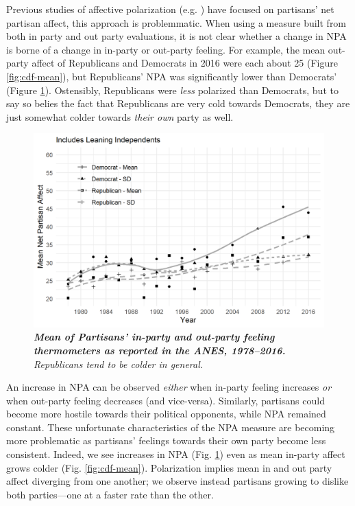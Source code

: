 \documentclass[12pt]{paper}
\begin{document}
Previous studies of affective polarization (e.g. \citet{iyengar2012affect}) have  focused on partisans' net partisan affect, this approach is problemmatic. When using a measure built from both in party and out party evaluations, it is not clear whether a change in NPA is borne of a change in in-party or out-party feeling. For example, the mean out-party affect of Republicans and Democrats in 2016 were each about 25 (Figure \ref{fig:cdf-mean}), but Republicans' NPA was significantly lower than Democrats' (Figure \ref{fig:cdf-npa}). Ostensibly, Republicans were \textit{less} polarized than Democrats, but to say so belies the fact that Republicans are very cold towards Democrats, they are just somewhat colder towards \textit{their own} party as well.
\begin{figure}[H]
\center\includegraphics[width=5in]{cdf-npa-ns.png}
\caption{\label{fig:cdf-npa} \textit{\textbf{Mean of Partisans' in-party and out-party feeling thermometers as reported in the ANES, 1978--2016.} Republicans tend to be colder in general.}}
\end{figure}

 An increase in NPA can be observed \textit{either} when in-party feeling increases \textit{or} when out-party feeling decreases (and vice-versa). Similarly, partisans could become more hostile towards their political opponents, while NPA remained constant. These unfortunate characteristics of the NPA measure are becoming more problematic as partisans' feelings towards their own party become less consistent. Indeed, we see increases in NPA (Fig. \ref{fig:cdf-npa}) even as mean in-party affect grows colder (Fig. \ref{fig:cdf-mean}).   Polarization implies mean in and out party affect diverging from one another; we observe instead partisans growing to dislike both parties---one at a faster rate than the other. 
\end{document}
